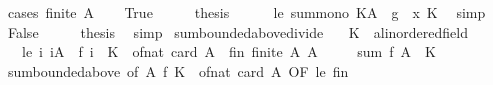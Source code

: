 \begin{isabellebody}
\ {\isacharparenleft}{\kern0pt}cases\ {\isachardoublequoteopen}finite\ A{\isachardoublequoteclose}{\isacharparenright}{\kern0pt}\isanewline
\ \ \isamarkupfalse%
\ True\isanewline
\ \ \isamarkupfalse%
\ \isamarkupfalse%
\ {\isacharquery}{\kern0pt}thesis\isanewline
\ \ \ \ \isamarkupfalse%
\ le\ sum{\isacharunderscore}{\kern0pt}mono{\isacharbrackleft}{\kern0pt}\ K{\isacharequal}{\kern0pt}A\ \ g\ {\isacharequal}{\kern0pt}\ {\isachardoublequoteopen}{\isasymlambda}x{\isachardot}{\kern0pt}\ K{\isachardoublequoteclose}{\isacharbrackright}{\kern0pt}\ \isamarkupfalse%
\ simp\isanewline
{}\isamarkupfalse%
\isanewline
\ \ \isamarkupfalse%
\ False\isanewline
\ \ \isamarkupfalse%
\ \isamarkupfalse%
\ {\isacharquery}{\kern0pt}thesis\ \isamarkupfalse%
\ simp\isanewline
{}\isamarkupfalse%
%
\endisatagproof
{\isafoldproof}%
%
\isadelimproof
\isanewline
%
\endisadelimproof
\isanewline
{}\isamarkupfalse%
\ sum{\isacharunderscore}{\kern0pt}bounded{\isacharunderscore}{\kern0pt}above{\isacharunderscore}{\kern0pt}divide{\isacharcolon}{\kern0pt}\isanewline
\ \ \ K\ {\isacharcolon}{\kern0pt}{\isacharcolon}{\kern0pt}\ {\isachardoublequoteopen}{\isacharprime}{\kern0pt}a{\isacharcolon}{\kern0pt}{\isacharcolon}{\kern0pt}linordered{\isacharunderscore}{\kern0pt}field{\isachardoublequoteclose}\isanewline
\ \ \ le{\isacharcolon}{\kern0pt}\ {\isachardoublequoteopen}{\isasymAnd}i{\isachardot}{\kern0pt}\ i{\isasymin}A\ {\isasymLongrightarrow}\ f\ i\ {\isasymle}\ K\ {\isacharslash}{\kern0pt}\ of{\isacharunderscore}{\kern0pt}nat\ {\isacharparenleft}{\kern0pt}card\ A{\isacharparenright}{\kern0pt}{\isachardoublequoteclose}\ \ fin{\isacharcolon}{\kern0pt}\ {\isachardoublequoteopen}finite\ A{\isachardoublequoteclose}\ {\isachardoublequoteopen}A\ {\isasymnoteq}\ {\isacharbraceleft}{\kern0pt}{\isacharbraceright}{\kern0pt}{\isachardoublequoteclose}\isanewline
\ \ \ {\isachardoublequoteopen}sum\ f\ A\ {\isasymle}\ K{\isachardoublequoteclose}\isanewline
%
\isadelimproof
\ \ %
\endisadelimproof
%
\isatagproof
{}\isamarkupfalse%
\ sum{\isacharunderscore}{\kern0pt}bounded{\isacharunderscore}{\kern0pt}above\ {\isacharbrackleft}{\kern0pt}of\ A\ f\ {\isachardoublequoteopen}K\ {\isacharslash}{\kern0pt}\ of{\isacharunderscore}{\kern0pt}nat\ {\isacharparenleft}{\kern0pt}card\ A{\isacharparenright}{\kern0pt}{\isachardoublequoteclose}{\isacharcomma}{\kern0pt}\ OF\ le{\isacharbrackright}{\kern0pt}\ fin\ \isamarkupfalse%

\end{isabellebody}
